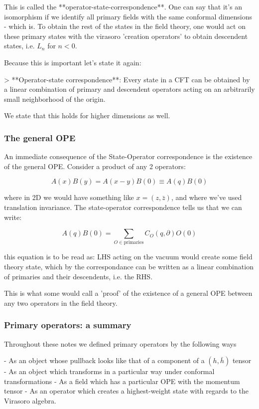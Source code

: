 This is called the **operator-state-correspondence**. One can say that it's an isomorphism if we identify all primary fields with the same conformal dimensions - which is. To obtain the rest of the states in the field theory, one would act on these primary states with the virasoro 'creation operators' to obtain descendent states, i.e. $L_n$ for $n < 0$.

Because this is important let's state it again: 

> **Operator-state correspondence**: Every state in a CFT can be obtained by a linear combination of primary and descendent operators  acting on an arbitrarily small neighborhood of the origin.

We state that this holds for higher dimensions as well.

\subsubsection{ The general OPE}

An immediate consequence of the State-Operator correspondence is the existence of the general OPE. Consider a product of any 2 operators:

$$A(x)B(y) = A(x-y)B(0) \equiv A(q) B(0)$$

where in 2D we would have something like $x = (z, \bar z)$, and where we've used translation invariance. The state-operator correspondence tells us that we can write:

$$A(q)B(0) = \sum_{O \in \text{primaries}} C_O(q, \partial) O(0)$$

this equation is to be read as: LHS acting on the vacuum would create some field theory state, which by the correspondance can be written as a linear combination of primaries and their descendents, i.e. the RHS.

This is what some would call a 'proof' of the existence of a general OPE between any two operators in the field theory. 

\subsubsection{ Primary operators: a summary}

Throughout these notes we defined primary operators by the following ways

- As an object whose pullback looks like that of a component of a $(h, \bar h)$ tensor
- As an object which transforms in a particular way under conformal transformations
- As a field which has a particular OPE with the momentum tensor
- As an operator which creates a highest-weight state with regards to the Virasoro algebra.


